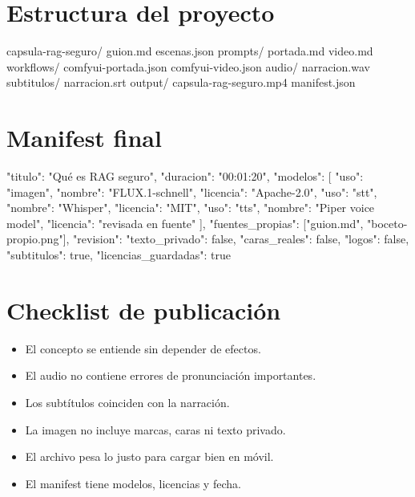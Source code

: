 \documentclass[11pt,a4paper]{book}
\begin{document}
\section{Estructura del proyecto}
\begin{codebox}
capsula-rag-seguro/
  guion.md
  escenas.json
  prompts/
    portada.md
    video.md
  workflows/
    comfyui-portada.json
    comfyui-video.json
  audio/
    narracion.wav
  subtitulos/
    narracion.srt
  output/
    capsula-rag-seguro.mp4
  manifest.json
\end{codebox}
\section{Manifest final}
\begin{codebox}
{
  "titulo": "Qué es RAG seguro",
  "duracion": "00:01:20",
  "modelos": [
    {"uso": "imagen", "nombre": "FLUX.1-schnell", "licencia": "Apache-2.0"},
    {"uso": "stt", "nombre": "Whisper", "licencia": "MIT"},
    {"uso": "tts", "nombre": "Piper voice model", "licencia": "revisada en fuente"}
  ],
  "fuentes_propias": ["guion.md", "boceto-propio.png"],
  "revision": {
    "texto_privado": false,
    "caras_reales": false,
    "logos": false,
    "subtitulos": true,
    "licencias_guardadas": true
  }
}
\end{codebox}
\section{Checklist de publicación}
\begin{itemize}\item El concepto se entiende sin depender de efectos.\end{itemize}
\begin{itemize}\item El audio no contiene errores de pronunciación importantes.\end{itemize}
\begin{itemize}\item Los subtítulos coinciden con la narración.\end{itemize}
\begin{itemize}\item La imagen no incluye marcas, caras ni texto privado.\end{itemize}
\begin{itemize}\item El archivo pesa lo justo para cargar bien en móvil.\end{itemize}
\begin{itemize}\item El manifest tiene modelos, licencias y fecha.\end{itemize}
\end{document}
